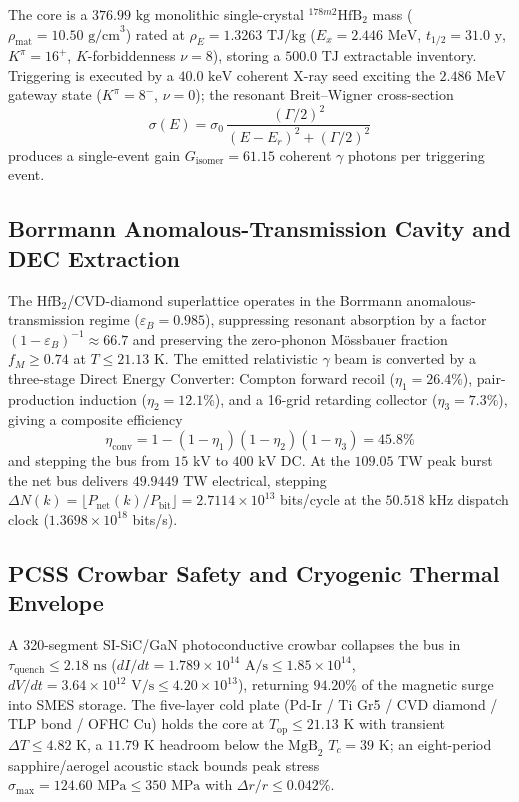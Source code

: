 \documentclass[twocolumn,aps,pra,floatfix,superscriptaddress,10pt]{revtex4-2}
\begin{document}
The core is a $376.99\text{ kg}$ monolithic single-crystal $^{178m2}\mathrm{HfB}_2$ mass ($\rho_{\text{mat}} = 10.50\text{ g/cm}^3$) rated at $\rho_E = 1.3263\text{ TJ/kg}$ ($E_x = 2.446\text{ MeV}$, $t_{1/2} = 31.0\text{ y}$, $K^\pi = 16^+$, $K$-forbiddenness $\nu = 8$), storing a $500.0\text{ TJ}$ extractable inventory. Triggering is executed by a $40.0\text{ keV}$ coherent X-ray seed exciting the $2.486\text{ MeV}$ gateway state ($K^\pi = 8^-$, $\nu = 0$); the resonant Breit--Wigner cross-section
\begin{equation}
\sigma(E) = \sigma_0\,\frac{(\Gamma/2)^2}{(E-E_r)^2 + (\Gamma/2)^2}
\end{equation}
produces a single-event gain $G_{\text{isomer}} = 61.15$ coherent $\gamma$ photons per triggering event.

\subsection{Borrmann Anomalous-Transmission Cavity and DEC Extraction}

The $\mathrm{HfB}_2$/CVD-diamond superlattice operates in the Borrmann anomalous-transmission regime ($\varepsilon_B = 0.985$), suppressing resonant absorption by a factor $(1-\varepsilon_B)^{-1} \approx 66.7$ and preserving the zero-phonon M\"ossbauer fraction $f_M \ge 0.74$ at $T \le 21.13\text{ K}$. The emitted relativistic $\gamma$ beam is converted by a three-stage Direct Energy Converter: Compton forward recoil ($\eta_1 = 26.4\%$), pair-production induction ($\eta_2 = 12.1\%$), and a 16-grid retarding collector ($\eta_3 = 7.3\%$), giving a composite efficiency
\begin{equation}
\eta_{\text{conv}} = 1 - (1-\eta_1)(1-\eta_2)(1-\eta_3) = 45.8\%
\end{equation}
and stepping the bus from $15\text{ kV}$ to $400\text{ kV}$ DC. At the $109.05\text{ TW}$ peak burst the net bus delivers $49.9449\text{ TW}$ electrical, stepping $\Delta N(k) = \lfloor P_{\text{net}}(k)/P_{\text{bit}}\rfloor = 2.7114\times10^{13}$ bits/cycle at the $50.518\text{ kHz}$ dispatch clock ($1.3698\times10^{18}$ bits/s).

\subsection{PCSS Crowbar Safety and Cryogenic Thermal Envelope}

A 320-segment SI-SiC/GaN photoconductive crowbar collapses the bus in $\tau_{\text{quench}} \le 2.18\text{ ns}$ ($dI/dt = 1.789\times10^{14}\text{ A/s} \le 1.85\times10^{14}$, $dV/dt = 3.64\times10^{12}\text{ V/s} \le 4.20\times10^{13}$), returning $94.20\%$ of the magnetic surge into SMES storage. The five-layer cold plate (Pd-Ir / Ti Gr5 / CVD diamond / TLP bond / OFHC Cu) holds the core at $T_{\text{op}} \le 21.13\text{ K}$ with transient $\Delta T \le 4.82\text{ K}$, a $11.79\text{ K}$ headroom below the $\mathrm{MgB}_2$ $T_c = 39\text{ K}$; an eight-period sapphire/aerogel acoustic stack bounds peak stress $\sigma_{\max} = 124.60\text{ MPa} \le 350\text{ MPa}$ with $\Delta r/r \le 0.042\%$.
\end{document}

